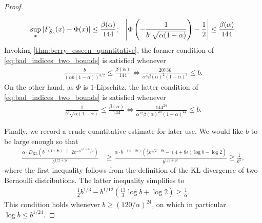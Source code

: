 \documentclass[11pt]{amsart}
\numberwithin{equation}{section}
\numberwithin{equation}{section}
\newcommand{\1}{\mathbbm{1}}
\newcommand{\KL}{D_{\mathrm{KL}}}
\newcommand{\doubleline}{\;\middle\|\;}
\theoremstyle{definition}
\begin{document}
\begin{appendices}
\begin{proof}
\begin{itemize}
        \begin{align} \label{eq:bad_indices_two_bounds}
            & \sup_x |F_{\Tilde{S}_b}(x) - \Phi(x)| \leq \frac{\beta(\alpha)}{144};
            & \left| \Phi\left( -\frac{1}{b^\epsilon \sqrt{\alpha(1-\alpha)}} \right) - \frac{1}{2} \right| \leq \frac{\beta(\alpha)}{144}.
        \end{align}
        Invoking \cref{thm:berry_esseen_quantitative}, the former condition of \eqref{eq:bad_indices_two_bounds} is satisfied whenever
        \begin{align*}
            \frac{b}{\left( \alpha b \left( 1 - \alpha \right) \right)^{3/2}} \leq \frac{\beta(\alpha)}{144} \iff \frac{20736}{\alpha^3\beta(\alpha)^2(1-\alpha)^3} \leq b.
        \end{align*}
        On the other hand, as $\Phi$ is $1$-Lipschitz, the latter condition of \eqref{eq:bad_indices_two_bounds} is satisfied whenever
        \begin{align*}
            \frac{1}{b^\epsilon \sqrt{\alpha(1-\alpha)}} \leq \frac{\beta(\alpha)}{144} \iff \frac{144^{24}}{\alpha^{12}\beta(\alpha)^{24} (1-\alpha)^{12}} \leq b.
        \end{align*}
    \end{itemize}
    Finally, we record a crude quantitative estimate for later use. We would like $b$ to be large enough so that
    \begin{align} \label{eq:planted_gap_b_asymp}
        \frac{\alpha \cdot \KL\left( b^{-(4+8\epsilon)} \doubleline 2e^{-b^{1/2-6\epsilon}/2} \right)}{b^{1/2+2\epsilon}} & \geq \frac{\alpha \cdot b^{-(4+8\epsilon)}\left( \frac{1}{2}b^{1/2-6\epsilon} -(4+8\epsilon)\log b - \log 2 \right)}{b^{1/2+2\epsilon}} \geq \frac{1}{b^5},
    \end{align}
    where the first inequality follows from the definition of the KL divergence of two Bernoulli distributions. The latter inequality simplifies to
    \begin{align*}
        \frac{1}{2}b^{1/3} - b^{1/12}\left( \frac{13}{3}\log b + \log 2 \right) \geq \frac{1}{\alpha}.
    \end{align*}
    This condition holds whenever $b \geq (120/\alpha)^{24}$, on which in particular $\log b \leq b^{1/24}$.

    \smallskip
    

\end{proof}
\end{appendices}
\end{document}
